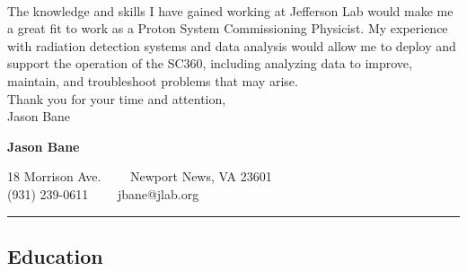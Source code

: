 \documentclass[12pt,letterpaper]{article}
\begin{document}
	\paragraph{}The knowledge and skills I have gained working at Jefferson Lab would make me a great fit to work as a Proton System Commissioning Physicist. My experience with radiation detection systems and data analysis would allow me to deploy and support the operation of the SC360, including analyzing data to improve, maintain, and troubleshoot problems that may arise. 
	\\
	
	\noindent Thank you for your time and attention,\\
	\noindent Jason Bane


%
\newpage
\fi
\begin{center}
{\LARGE \textbf{Jason Bane}}

18 Morrison Ave.\ \ \textbullet
\ \ Newport News, VA 23601 \\
(931) 239-0611\ \ \textbullet
\ \ jbane@jlab.org
\end{center}

\hrule
\vspace{-0.4em}
\subsection*{Education}
\end{document}
